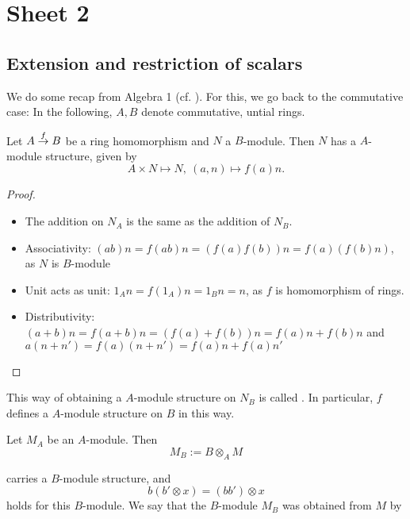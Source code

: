 \section{Sheet 2}

\subsection*{Extension and restriction of scalars}
We do some recap from Algebra 1 (cf. \cite[27f.]{atiyah1994introduction}). For this, we go back to the commutative case: In the following, $A,B$ denote commutative, untial rings. \\
\begin{prop}
  Let $A\overset{f}{\to}B$ be a ring homomorphism and $N$ a $B$-module. Then $N$ has a $A$-module structure, given by
  \[
  A\times N\mapsto N,~(a,n)\mapsto f(a)n.\]
\end{prop}
\begin{proof}
  \begin{itemize}
    \item The addition on $N_A$  is the same as the addition of $N_B$. \\
    \item Associativity: $(ab)n = f(ab)n = (f(a)f(b))n = f(a)(f(b)n)$, as $N$ is $B$-module
    \item Unit acts as unit: $1_An = f(1_A)n = 1_Bn = n$, as $f$ is homomorphism of rings.
    \item Distributivity: $(a+b)n=f(a+b)n = (f(a)+f(b))n = f(a)n+f(b)n$ and $a(n+n') = f(a)(n+n') = f(a)n+f(a)n'$
  \end{itemize}
\end{proof}
This way of obtaining a $A$-module structure on $N_B$ is called . In particular, $f$ defines a $A$-module structure on $B$ in this way.\\
\begin{prop}
  Let $M_A$ be an $A$-module. Then
  \[
  M_B:= B\otimes_A M
  \]

  carries a $B$-module structure, and
  \[
  b(b'\otimes x) = (bb')\otimes x
  \]
  holds for this $B$-module. We say that the $B$-module $M_B$ was obtained from $M$ by 
\end{prop}
